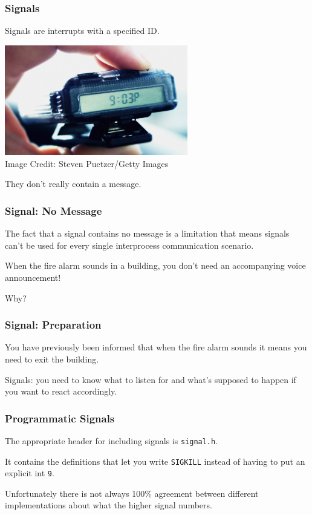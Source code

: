 \begin{frame}
\frametitle{Signals}

Signals are interrupts with a specified ID.

\begin{center}
	\includegraphics[width=0.6\textwidth]{images/pager.jpg}\\
	Image Credit:  Steven Puetzer/Getty Images
\end{center}

They don't really contain a message. 

\end{frame}


\begin{frame}
\frametitle{Signal: No Message}

The fact that a signal contains no message is a limitation that means signals can't be used for every single interprocess communication scenario. 

 When the fire alarm sounds in a building, you don't need an accompanying voice announcement!

Why?

\end{frame}



\begin{frame}
\frametitle{Signal: Preparation}

You have previously been informed that when the fire alarm sounds it means you need to exit the building.

Signals: you need to know what to listen for and what's supposed to happen if you want to react accordingly.

\end{frame}


\begin{frame}
\frametitle{Programmatic Signals}

The appropriate header for including signals is \texttt{signal.h}.

It contains the definitions that let you write \texttt{SIGKILL} instead of having to put an explicit int \texttt{9}.

Unfortunately there is not always 100\% agreement between different implementations about what the higher signal numbers.

\end{frame}


